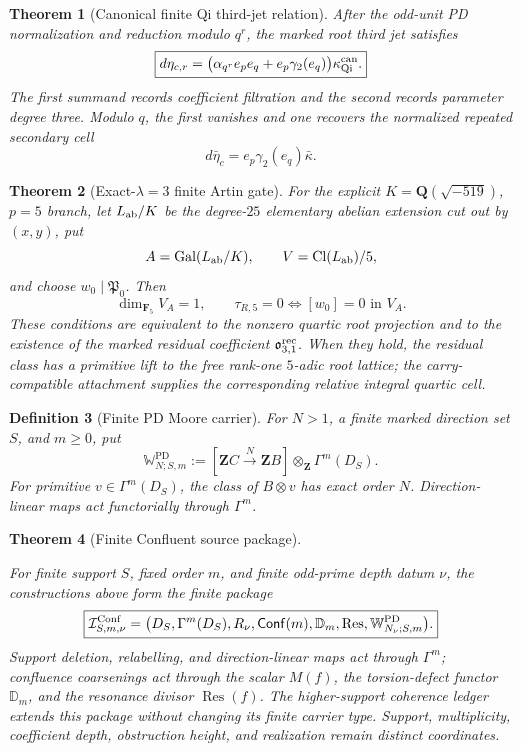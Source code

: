\documentclass[11pt]{article}
\newtheorem{theorem}{Theorem}[section]
\newtheorem{definition}[theorem]{Definition}
\theoremstyle{remark}
\newcommand{\Z}{\mathbf Z}
\newcommand{\F}{\mathbf F}
\providecommand{\Q}{\mathbf Q}
\providecommand{\Gal}{\operatorname{Gal}}
\providecommand{\Cl}{\operatorname{Cl}}
\begin{document}
\begin{theorem}[Canonical finite Qi third-jet relation]
\label{P1C-thm:finite-qi-bifiltered-relation}
After the odd-unit PD normalization and reduction modulo \(q^r\), the marked
root third jet satisfies
\[
 \boxed{
 d\eta_{c,r}
 =\bigl(\alpha_{q^r}e_pe_q+e_p\gamma_2(e_q)\bigr)
   \kappa_{\rm Qi}^{\rm can}.}
\]
The first summand records coefficient filtration and the second records
parameter degree three.  Modulo \(q\), the first vanishes and one recovers the
normalized repeated secondary cell
\[
 d\bar\eta_c=e_p\gamma_2(e_q)\bar\kappa .
\]
\end{theorem}

\begin{theorem}[Exact-\(\lambda=3\) finite Artin gate]
\label{P1C-thm:lambda3-heisenberg-central-gate}
\label{P1C-cor:lambda3-quartic-handoff}
For the explicit \(K=\Q(\sqrt{-519})\), \(p=5\) branch, let
\(L_{\rm ab}/K\) be the degree-\(25\) elementary abelian extension cut out by
\((x,y)\), put
\[
 A=\Gal(L_{\rm ab}/K),\qquad V=\Cl(L_{\rm ab})/5,
\]
and choose \(w_0\mid\mathfrak P_0\).  Then
\[
 \boxed{
 \dim_{\F_5}V_A=1,\qquad
 \tau_{R,5}=0\Longleftrightarrow[w_0]=0\text{ in }V_A.}
\]
These conditions are equivalent to the nonzero quartic root projection and
to the existence of the marked residual coefficient
\(\mathfrak o^{\rm rec}_{3,1}\).  When they hold, the residual class has a
primitive lift to the free rank-one \(5\)-adic root lattice; the
carry-compatible attachment supplies the corresponding relative integral
quartic cell.
\end{theorem}

\begin{definition}[Finite PD Moore carrier]
\label{P1C-def:abstract-finite-pd-carrier}
For \(N>1\), a finite marked direction set \(S\), and \(m\ge0\), put
\[
 \boxed{
 \mathbb W^{\mathrm{PD}}_{N;S,m}
 :=
 [\Z C\xrightarrow{\,N\,}\Z B]\otimes_{\Z}\Gamma^m(D_S).}
\]
For primitive \(v\in\Gamma^m(D_S)\), the class of \(B\otimes v\) has exact
order \(N\).  Direction-linear maps act functorially through \(\Gamma^m\).
\end{definition}

\begin{theorem}[Finite Confluent source package]
\label{P1C-thm:finite-confluent-interface}


For finite support \(S\), fixed order \(m\), and finite odd-prime depth datum
\(\nu\), the constructions above form the finite package
\[
 \boxed{
 \mathcal I^{\rm Conf}_{S,m,\nu}
 =
 \bigl(
 D_S,\Gamma^m(D_S),R_\nu,
 \mathsf{Conf}(m),\mathbb D_m,\operatorname{Res},
 \mathbb W^{\mathrm{PD}}_{N_\nu;S,m}
 \bigr).}
\]
Support deletion, relabelling, and direction-linear maps act through
\(\Gamma^m\); confluence coarsenings act through the scalar \(M(f)\), the
torsion-defect functor \(\mathbb D_m\), and the resonance divisor
\(\operatorname{Res}(f)\).  The higher-support coherence ledger extends this
package without changing its finite carrier type.  Support, multiplicity,
coefficient depth, obstruction height, and realization remain distinct
coordinates.
\end{theorem}
\end{document}
